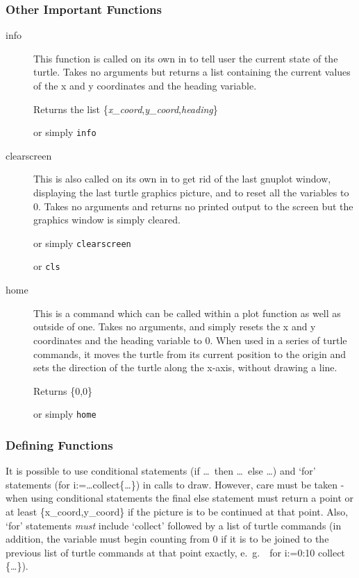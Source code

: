 \subsubsection{Other Important Functions}
\begin{description}
 \item[info] This function is called on its own in {\REDUCE} to tell
       user the current state of the turtle. Takes no arguments but
       returns a list containing the current values of the x and y
       coordinates and the heading variable.

       Returns the list \{\textit{x\_coord},\textit{y\_coord},\textit{heading}\}

        or simply \texttt{info}
 \item[clearscreen] This is also called on its own in {\REDUCE} to
       get rid of the last gnuplot window, displaying the last turtle
       graphics picture, and to reset all the variables to 0. Takes no
       arguments and returns no printed output to the screen but the
       graphics window is simply cleared.

        or simply \texttt{clearscreen}

        or \texttt{cls}
 \item[home] This is a command which can be called within a plot function
       as well as outside of one. Takes no arguments, and simply resets
       the x and y coordinates and the heading variable to 0. When used in 
       a series of turtle commands, it moves the turtle from its current
       position to the origin and sets the direction of the turtle along
       the x-axis, without drawing a line.

       Returns \{0,0\}

        or simply \texttt{home}
\end{description}

\subsubsection{Defining Functions}

  It is possible to use conditional statements (if \ldots\ then \ldots\
else \ldots) and `for' statements (for i:=\ldots collect\{\ldots\}) in
calls to draw. However, care must be taken - when using conditional
statements the final else statement must return a point or at least
\{x\_coord,y\_coord\} if the picture is to be continued at that point.
Also, `for' statements {\em must} include `collect' followed by a list of
turtle commands (in addition, the variable must begin counting from 0 if
it is to be joined to the previous list of turtle commands at that point
exactly, e.\ g.\ \ for i:=0:10 collect \{\ldots\}).


